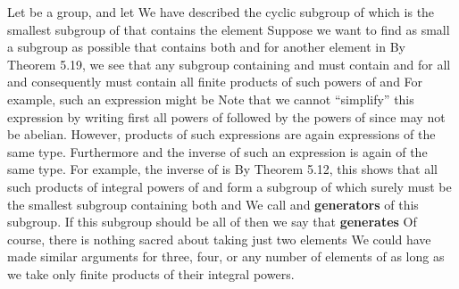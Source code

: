 \documentclass[11pt,oneside]{article}
\begin{document}
\fi
\renewcommand{\BookFooter}{Section 7 Generating Sets and Cayley Digraphs}
\ifdefined\BookMaster\else\setcounter{page}{70}\fi
\BookNarrativetrue

\begin{BookBody}


\noindent Let  be a group, and let  We have described the cyclic subgroup  of  which is the smallest subgroup of  that contains the element  Suppose we want to find as small a subgroup as possible that contains both  and  for another element  in  By Theorem 5.19, we see that any subgroup containing  and  must contain  and  for all  and consequently must contain all finite products of such powers of  and  For example, such an expression might be  Note that we cannot “simplify” this expression by writing first all powers of  followed by the powers of  since  may not be abelian. However, products of such expressions are again expressions of the same type. Furthermore and the inverse of such an expression is again of the same type. For example, the inverse of  is  By Theorem 5.12, this shows that all such products of integral powers of  and  form a subgroup of  which surely must be the smallest subgroup containing both  and  We call  and  \textbf{generators} of this subgroup. If this subgroup should be all of  then we say that  \textbf{generates}  Of course, there is nothing sacred about taking just two elements  We could have made similar arguments for three, four, or any number of elements of  as long as we take only finite products of their integral powers.


\end{BookBody}
\end{document}
